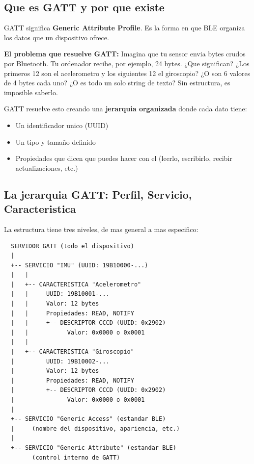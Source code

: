 \documentclass[11pt,a4paper]{article}
\begin{document}
\subsection{Que es GATT y por que existe}

GATT significa \textbf{Generic Attribute Profile}. Es la forma en
que BLE organiza los datos que un dispositivo ofrece.

\textbf{El problema que resuelve GATT:} Imagina que tu sensor envia
bytes crudos por Bluetooth. Tu ordenador recibe, por ejemplo, 24
bytes. ¿Que significan? ¿Los primeros 12 son el acelerometro y los
siguientes 12 el giroscopio? ¿O son 6 valores de 4 bytes cada uno?
¿O es todo un solo string de texto? Sin estructura, es imposible
saberlo.

GATT resuelve esto creando una \textbf{jerarquia organizada} donde
cada dato tiene:
\begin{itemize}
    \item Un identificador unico (UUID)
    \item Un tipo y tamaño definido
    \item Propiedades que dicen que puedes hacer con el (leerlo,
          escribirlo, recibir actualizaciones, etc.)
\end{itemize}

\subsection{La jerarquia GATT: Perfil, Servicio, Caracteristica}

La estructura tiene tres niveles, de mas general a mas especifico:

\begin{verbatim}
  SERVIDOR GATT (todo el dispositivo)
  |
  +-- SERVICIO "IMU" (UUID: 19B10000-...)
  |   |
  |   +-- CARACTERISTICA "Acelerometro"
  |   |     UUID: 19B10001-...
  |   |     Valor: 12 bytes
  |   |     Propiedades: READ, NOTIFY
  |   |     +-- DESCRIPTOR CCCD (UUID: 0x2902)
  |   |           Valor: 0x0000 o 0x0001
  |   |
  |   +-- CARACTERISTICA "Giroscopio"
  |         UUID: 19B10002-...
  |         Valor: 12 bytes
  |         Propiedades: READ, NOTIFY
  |         +-- DESCRIPTOR CCCD (UUID: 0x2902)
  |               Valor: 0x0000 o 0x0001
  |
  +-- SERVICIO "Generic Access" (estandar BLE)
  |     (nombre del dispositivo, apariencia, etc.)
  |
  +-- SERVICIO "Generic Attribute" (estandar BLE)
        (control interno de GATT)
\end{verbatim}
\end{document}
